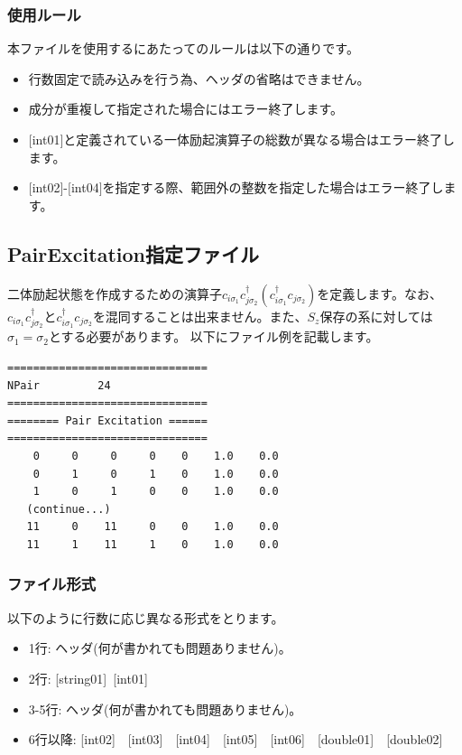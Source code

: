\subsubsection{使用ルール}
本ファイルを使用するにあたってのルールは以下の通りです。
\begin{itemize}
\item 行数固定で読み込みを行う為、ヘッダの省略はできません。
\item 成分が重複して指定された場合にはエラー終了します。
\item $[$int01$]$と定義されている一体励起演算子の総数が異なる場合はエラー終了します。
\item $[$int02$]$-$[$int04$]$を指定する際、範囲外の整数を指定した場合はエラー終了します。
\end{itemize}

\newpage
\subsection{{PairExcitation指定ファイル}}
\label{Subsec:pairexcitation}
二体励起状態を作成するための演算子$c_{i\sigma_1}c_{j\sigma_2}^{\dagger}(c_{i\sigma_1}^{\dagger}c_{j\sigma_2})$を定義します。なお、$c_{i\sigma_1}c_{j\sigma_2}^{\dagger}$と$c_{i\sigma_1}^{\dagger}c_{j\sigma_2}$を混同することは出来ません。また、$S_z$保存の系に対しては$\sigma_1=\sigma_2$とする必要があります。
以下にファイル例を記載します。

\begin{minipage}{12.5cm}
\begin{screen}
\begin{verbatim}
===============================
NPair         24
===============================
======== Pair Excitation ======
===============================
    0     0     0     0    0    1.0    0.0
    0     1     0     1    0    1.0    0.0
    1     0     1     0    0    1.0    0.0
   (continue...)
   11     0    11     0    0    1.0    0.0
   11     1    11     1    0    1.0    0.0
\end{verbatim}
\end{screen}
\end{minipage}

\subsubsection{ファイル形式}
以下のように行数に応じ異なる形式をとります。
 \begin{itemize}
   \item  1行:  ヘッダ(何が書かれても問題ありません)。
   \item  2行:   [string01]~[int01]
   \item  3-5行:  ヘッダ(何が書かれても問題ありません)。
   \item  6行以降: [int02]~~[int03]~~[int04]~~[int05]~~[int06]~~[double01]~~[double02]
  \end{itemize}

